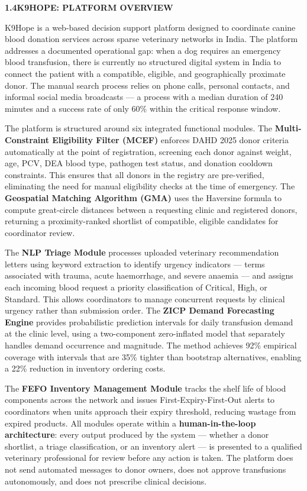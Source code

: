 \documentclass[12pt,a4paper]{article}
\begin{document}
\vspace{1.5em}
\noindent\textbf{1.4\quad K9HOPE: PLATFORM OVERVIEW}
\vspace{0.6em}

\noindent K9Hope is a web-based decision support platform designed to coordinate canine blood donation services across sparse veterinary networks in India. The platform addresses a documented operational gap: when a dog requires an emergency blood transfusion, there is currently no structured digital system in India to connect the patient with a compatible, eligible, and geographically proximate donor. The manual search process relies on phone calls, personal contacts, and informal social media broadcasts — a process with a median duration of 240 minutes and a success rate of only 60\% within the critical response window.

\noindent The platform is structured around six integrated functional modules. The \textbf{Multi-Constraint Eligibility Filter (MCEF)} enforces DAHD 2025 donor criteria automatically at the point of registration, screening each donor against weight, age, PCV, DEA blood type, pathogen test status, and donation cooldown constraints. This ensures that all donors in the registry are pre-verified, eliminating the need for manual eligibility checks at the time of emergency. The \textbf{Geospatial Matching Algorithm (GMA)} uses the Haversine formula to compute great-circle distances between a requesting clinic and registered donors, returning a proximity-ranked shortlist of compatible, eligible candidates for coordinator review.

\noindent The \textbf{NLP Triage Module} processes uploaded veterinary recommendation letters using keyword extraction to identify urgency indicators — terms associated with trauma, acute haemorrhage, and severe anaemia — and assigns each incoming blood request a priority classification of Critical, High, or Standard. This allows coordinators to manage concurrent requests by clinical urgency rather than submission order. The \textbf{ZICP Demand Forecasting Engine} provides probabilistic prediction intervals for daily transfusion demand at the clinic level, using a two-component zero-inflated model that separately handles demand occurrence and magnitude. The method achieves 92\% empirical coverage with intervals that are 35\% tighter than bootstrap alternatives, enabling a 22\% reduction in inventory ordering costs.

\noindent The \textbf{FEFO Inventory Management Module} tracks the shelf life of blood components across the network and issues First-Expiry-First-Out alerts to coordinators when units approach their expiry threshold, reducing wastage from expired products. All modules operate within a \textbf{human-in-the-loop architecture}: every output produced by the system — whether a donor shortlist, a triage classification, or an inventory alert — is presented to a qualified veterinary professional for review before any action is taken. The platform does not send automated messages to donor owners, does not approve transfusions autonomously, and does not prescribe clinical decisions.
\end{document}
